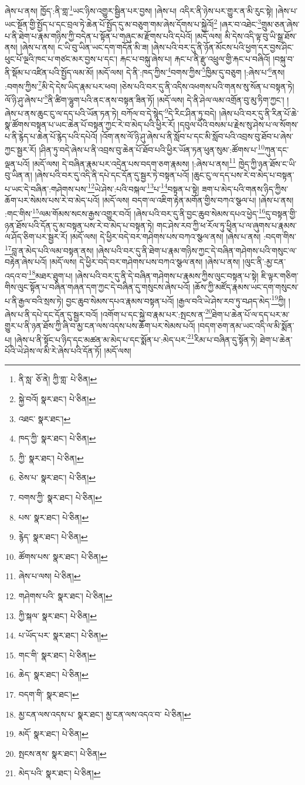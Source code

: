 ཞེས་པ་ནས། ཁྱོད་:ནི་གླ་\footnote{ནི་སླ་  ཅོ་ནེ། ཀྱི་གླ་  པེ་ཅིན། }ཡང་ཉིས་འགྱུར་སྦྱིན་པར་བྱས། །ཞེས་པ། འདིར་ནི་ཉེས་པར་གྱུར་ན་མི་རུང་སྟེ། །ཞེས་པ་ཡང་སྔོན་གྱི་སྤྱོད་པ་དང་བྲལ་ཏེ་ཆེན་པོ་སྤྱོད་དུ་མ་བཅུག་གམ་ཞེས་དོགས་པ་སྐྱེའོ།\footnote{སྐྱེ་བའོ།  སྣར་ཐང་།  པེ་ཅིན། } །ཞར་བ་འཐེང་\footnote{འཐང་  སྣར་ཐང་། }གྲུམ་ཅན་ཞེས་པ་ནི་ཐེག་པ་རྣམ་གཉིས་ཀྱི་བདེན་པ་སྟོན་པ་གཞུང་མ་རྫོགས་པའི་དཔེའོ། །མདོ་ལས། མི་དེས་འདི་ལྟ་བུ་ཡི་སྒྲ་ཐོས་ནས། །ཞེས་པ་ནས། ང་ཡི་བུ་ཡིན་ཡང་དག་གདོན་མི་ཟ། །ཞེས་པའི་བར་དུ་ནི་ཉོན་མོངས་པའི་ཕྱག་དར་བྱས་ཤིང་ཕུང་པོ་ལྔའི་ཁང་པ་གཙང་མར་བྱས་པ་དང་། རྐང་པ་བསྐུ་ཞེས་པ། རྐང་པ་ནི་རྫུ་འཕྲུལ་གྱི་རྐང་པ་བཞིའོ། །བསྐུ་བ་ནི་སྡོམ་པ་འཛིན་པའི་སྤྱོད་ལམ་མོ། །མདོ་ལས། དེ་ནི་:ཁད་ཀྱིས་\footnote{ཁད་ཀྱི་  སྣར་ཐང་།  པེ་ཅིན། }བགས་ཀྱིས་\footnote{ཀྱི་  སྣར་ཐང་།  པེ་ཅིན། }ཁྱིམ་དུ་བཅུག །:ཞེས་པ་\footnote{ཅེས་པ་  སྣར་ཐང་།  པེ་ཅིན། }ནས། :བགས་ཀྱིས་\footnote{བགས་ཀྱི་  སྣར་ཐང་།  པེ་ཅིན། }མི་དེ་དེས་ཡིད་རྣམ་པར་ཕབ། །ཅེས་པའི་བར་དུ་ནི་འདིས་འཕགས་པའི་གནས་སུ་སོན་པ་བསྟན་ཏེ། ལོ་ཉི་ཤུ་ཞེས་པ་\footnote{པས་  སྣར་ཐང་།  པེ་ཅིན། }ནི་ཚིག་ལྷུག་པའི་ནང་ནས་བསྟན་ཟིན་ཏོ། །མདོ་ལས། དེ་ནི་ཤེལ་ལམ་འགྲོན་བུ་མུ་ཏིག་ཀྱང་། །ཞེས་པ་ནས་ཆུང་ངུ་ལ་དད་པའི་ཡོན་ཏན་ཏེ། བཀོལ་བ་དེ་སྙེད་\footnote{རྙེད་  སྣར་ཐང་།  པེ་ཅིན། }དེ་རིང་ཤིན་ཏུ་བདེ། །ཞེས་པའི་བར་དུ་ནི་རིན་པོ་ཆེ་སྣ་ཚོགས་བསྟན་པ་ཡང་ཆེན་པོ་བསྟན་ཀྱང་རེ་བ་མེད་པའི་ཕྱིར་རོ། །དབུལ་པོའི་བསམ་པ་རྗེས་སུ་ཤེས་པ་ལ་སོགས་པ་ནི་རྙེད་པ་ཆེན་པོ་རྙེད་པའི་དཔེའོ། །འོག་ནས་ལོ་ཉི་ཤུ་ཞེས་པ་ནི་སློབ་པ་དང་མི་སློབ་པའི་འབྲས་བུ་ཐོབ་པ་ཞེས་ཀྱང་སྦྱར་རོ། །ཤིན་ཏུ་བདེ་ཞེས་པ་ནི་འབྲས་བུ་ཆེན་པོ་ཐོབ་པའི་ཕྱིར་ཡོན་ཏན་ཕུན་སུམ་:ཚོགས་པ་\footnote{ཚོགས་པས་  སྣར་ཐང་།  པེ་ཅིན། }ཀུན་དང་ལྡན་པའོ། །མདོ་ལས། དེ་བཞིན་རྣམ་པར་འདྲེན་པས་བདག་ཅག་རྣམས། །:ཞེས་པ་ནས།\footnote{ཞེས་པ་ལས།  པེ་ཅིན། } ཁྱེད་ཀྱི་ཉན་ཐོས་ང་ཡི་བུ་ཡིན་ན། །ཞེས་པའི་བར་དུ་འདི་ནི་དཔེ་དང་དོན་དུ་སྦྱར་ཏེ་བསྟན་པའོ། །ཆུང་ངུ་ལ་དད་པས་རེ་བ་མེད་པ་བསྟན་པ་ཡང་དེ་བཞིན་:གཤེགས་པས་\footnote{གཤེགས་པའི་  སྣར་ཐང་།  པེ་ཅིན། }ཡེ་ཤེས་:པའི་བསྐལ་\footnote{ཀྱི་སྐལ་  སྣར་ཐང་།  པེ་ཅིན། }པ་\footnote{པ་ཡོད་པར་  སྣར་ཐང་།  པེ་ཅིན། }བསྟན་པ་སྟེ། ཟག་པ་མེད་པའི་གནས་ཉིད་ཀྱིས་ཆོག་པར་སེམས་པས་རེ་བ་མེད་པའོ། །མདོ་ལས། བདག་ལ་འཇིག་རྟེན་མགོན་གྱིས་བཀའ་སྩལ་པ། །ཞེས་པ་ནས། :གང་གིས་\footnote{གང་གི་  སྣར་ཐང་།  པེ་ཅིན། }ལམ་གོམས་སངས་རྒྱས་འགྱུར་བའོ། །ཞེས་པའི་བར་དུ་ནི་བྱང་ཆུབ་སེམས་དཔའ་ཕྱེད་\footnote{ཆེད་  སྣར་ཐང་།  པེ་ཅིན། }དུ་བསྟན་གྱི་ཉན་ཐོས་པའི་དོན་དུ་མ་བསྟན་པས་རེ་བ་མེད་པ་བསྟན་ཏེ། གང་ཤེས་རབ་ཀྱི་ཕ་རོལ་ཏུ་ཕྱིན་པ་ལ་ཞུགས་པ་རྣམས་ལ་ཤོད་ཅིག་པར་སྦྱར་རོ། །མདོ་ལས། དེ་ཕྱིར་བདེ་བར་གཤེགས་པས་བཀའ་སྩལ་ནས། །ཞེས་པ་ནས། :བདག་གིས་\footnote{བདག་གི་  སྣར་ཐང་། }བླ་ན་མེད་པའི་ལམ་བསྟན་ནས། །ཞེས་པའི་བར་དུ་ནི་ཐེག་པ་རྣམ་གཉིས་ཀྱང་དེ་བཞིན་གཤེགས་པའི་གསུང་ལ་བརྟེན་ཞེས་པའོ། །མདོ་ལས། དེ་ཕྱིར་བདེ་བར་གཤེགས་པས་བཀའ་སྩལ་ནས། །ཞེས་པ་ནས། །ལུང་ནི་:མྱ་ངན་འདའ་བ་\footnote{མྱ་ངན་ལས་འདས་པ་  སྣར་ཐང་། མྱ་ངན་ལས་འདའ་བ་  པེ་ཅིན། }མཐར་ཐུག་པ། །ཞེས་པའི་བར་དུ་ནི་དེ་བཞིན་གཤེགས་པ་རྣམས་ཀྱིས་ལུང་བསྟན་པ་སྟེ། ཇི་ལྟར་གཅིག་གིས་ལུང་སྟོན་པ་བཞིན་གཞན་དག་ཀྱང་དེ་བཞིན་དུ་གསུངས་ཞེས་པའོ། །ཆོས་ཀྱི་མཛོད་རྣམས་ཡང་དག་གསུངས་པ་ནི་རྒྱལ་བའི་སྲས་ཏེ། བྱང་ཆུབ་སེམས་དཔའ་རྣམས་བསྟན་པའོ། །རྒྱལ་བའི་ཡེ་ཤེས་རབ་ཏུ་བཤད་མེད་\footnote{མདོ་  སྣར་ཐང་།  པེ་ཅིན། }ཀྱི། །ཞེས་པ་ནི་དཔེ་དང་དོན་དུ་སྦྱར་བའོ། །འགོག་པ་དང་སྐྱེ་བ་རྣམ་པར་:སྤངས་ན་\footnote{སྤངས་ནས་  སྣར་ཐང་།  པེ་ཅིན། }ཐེག་པ་ཆེན་པོ་ལ་དད་པར་མ་གྱུར་པ་ནི་ཉན་ཐོས་ཀྱི་ཞི་བ་མྱ་ངན་ལས་འདས་པས་ཆོག་པར་སེམས་པའོ། །བདག་ཅག་ནམ་ཡང་འདི་ལ་མི་སྨོན་པ། །ཞེས་པ་ནི་སྟོང་པ་ཉིད་དང་མཚན་མ་མེད་པ་དང་སྨོན་པ་:མེད་པར་\footnote{མེད་པའི་  སྣར་ཐང་།  པེ་ཅིན། }རིམ་པ་བཞིན་དུ་སྟོན་ཏེ། ཐེག་པ་ཆེན་པོའི་ཡེ་ཤེས་ལ་མི་རེ་ཞེས་པའི་དོན་ཏོ། །མདོ་ལས། 